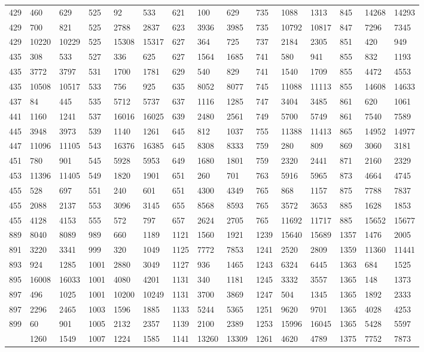 \begin{longtable}{*4{A@{\hspace*{5mm}}A}}
	429&460&629&525&92&533&621&100&629&735&1088&1313&845&14268&14293\\
	429&700&821&525&2788&2837&623&3936&3985&735&10792&10817&847&7296&7345\\
	429&10220&10229&525&15308&15317&627&364&725&737&2184&2305&851&420&949\\
	435&308&533&527&336&625&627&1564&1685&741&580&941&855&832&1193\\
	435&3772&3797&531&1700&1781&629&540&829&741&1540&1709&855&4472&4553\\
	435&10508&10517&533&756&925&635&8052&8077&745&11088&11113&855&14608&14633\\
	437&84&445&535&5712&5737&637&1116&1285&747&3404&3485&861&620&1061\\
	441&1160&1241&537&16016&16025&639&2480&2561&749&5700&5749&861&7540&7589\\
	445&3948&3973&539&1140&1261&645&812&1037&755&11388&11413&865&14952&14977\\
	447&11096&11105&543&16376&16385&645&8308&8333&759&280&809&869&3060&3181\\
	451&780&901&545&5928&5953&649&1680&1801&759&2320&2441&871&2160&2329\\
	453&11396&11405&549&1820&1901&651&260&701&763&5916&5965&873&4664&4745\\
	455&528&697&551&240&601&651&4300&4349&765&868&1157&875&7788&7837\\
	455&2088&2137&553&3096&3145&655&8568&8593&765&3572&3653&885&1628&1853\\
	455&4128&4153&555&572&797&657&2624&2705&765&11692&11717&885&15652&15677\\
	889&8040&8089&989&660&1189&1121&1560&1921&1239&15640&15689&1357&1476&2005\\
	891&3220&3341&999&320&1049&1125&7772&7853&1241&2520&2809&1359&11360&11441\\
	893&924&1285&1001&2880&3049&1127&936&1465&1243&6324&6445&1363&684&1525\\
	895&16008&16033&1001&4080&4201&1131&340&1181&1245&3332&3557&1365&148&1373\\
	897&496&1025&1001&10200&10249&1131&3700&3869&1247&504&1345&1365&1892&2333\\
	897&2296&2465&1003&1596&1885&1133&5244&5365&1251&9620&9701&1365&4028&4253\\
	899&60&901&1005&2132&2357&1139&2100&2389&1253&15996&16045&1365&5428&5597\\
	&1260&1549&1007&1224&1585&1141&13260&13309&1261&4620&4789&1375&7752&7873\\

\end{longtable}
